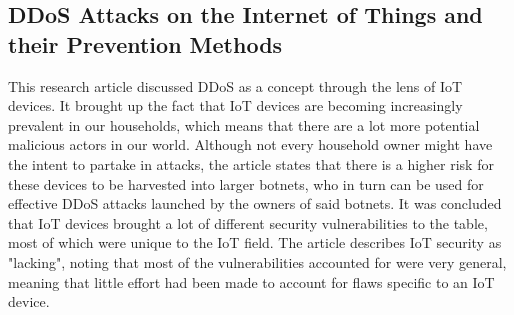 \documentclass[a4paper, titlepage,12pt]{article}
\begin{document}
	\subsection{DDoS Attacks on the Internet of Things and their Prevention Methods}
		This research article discussed DDoS as a concept through the lens of IoT devices. It brought up the fact that IoT devices are becoming increasingly prevalent in our households, which means that there are a lot more potential malicious actors in our world. Although not every household owner might have the intent to partake in attacks, the article states that there is a higher risk for these devices to be harvested into larger botnets, who in turn can be used for effective DDoS attacks launched by the owners of said botnets. It was concluded that IoT devices brought a lot of different security vulnerabilities to the table, most of which were unique to the IoT field. The article describes IoT security as "lacking", noting that most of the vulnerabilities accounted for were very general, meaning that little effort had been made to account for flaws specific to an IoT device. \cite{10.1145/3231053.3231057}

	\newpage
	\printbibliography
\end{document}
